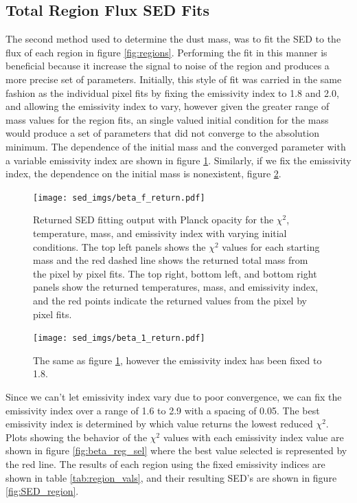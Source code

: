 \subsection{Total Region Flux SED Fits}

The second method used to determine the dust mass, was to fit the SED to the flux of each region in figure \ref{fig:regions}.  Performing the fit in this manner is beneficial because it increase the signal to noise of the region and produces a more precise set of parameters.  Initially, this style of fit was carried in the same fashion as the individual pixel fits  by fixing the emissivity index to 1.8 and 2.0, and allowing the emissivity index to vary, however given the greater range of mass values for the region fits, an single valued initial condition for the mass would produce a set of parameters that did not converge to the absolution minimum.  The dependence of the initial mass and the converged parameter with a variable emissivity index are shown in figure \ref{fig:init_mass_bf}.  Similarly, if we fix the emissivity index, the dependence on the initial mass is nonexistent, figure \ref{fig:init_mass_b1}.

\begin{figure}
  \centering
  \texttt{[image: sed\_imgs/beta\_f\_return.pdf]}
  \caption[Initial Mass Dependence and Convergence of SED Fits for Region Fluxes and Variable Emissivity Index]{Returned SED fitting output with Planck opacity for the $\chi^2$, temperature, mass, and emissivity index with varying initial conditions.  The top left panels shows the $\chi^2$ values for each starting mass and the red dashed line shows the returned total mass from the pixel by pixel fits.  The top right, bottom left, and bottom right panels show the returned temperatures, mass, and emissivity index, and the red points indicate the returned values from the pixel by pixel fits.}
  \label{fig:init_mass_bf}
\end{figure}

\begin{figure}
  \centering
  \texttt{[image: sed\_imgs/beta\_1\_return.pdf]}
  \caption[Initial Mass Dependence and Convergence of SED Fits for Region Fluxes and Fixed Emissivity Index]{The same as figure \ref{fig:init_mass_bf}, however the emissivity index has been fixed to 1.8.}
  \label{fig:init_mass_b1}
\end{figure}

Since we can't let emissivity index vary due to poor convergence, we can fix the emissivity index over a range of 1.6 to 2.9 with a spacing of 0.05.  The best emissivity index is determined by which value returns the lowest reduced $\chi^2$.  Plots showing the behavior of the $\chi^2$ values with each emissivity index value are shown in figure \ref{fig:beta_reg_sel} where the best value selected is represented by the red line. The results of each region using the fixed emissivity indices are shown in table \ref{tab:region_vals}, and their resulting SED's are shown in figure \ref{fig:SED_region}.

